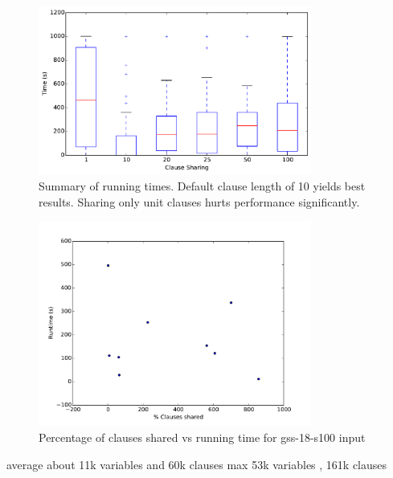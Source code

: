 \documentclass{article}
\begin{document}
\begin{figure}[h]
  \centering
    \includegraphics[width=0.8\textwidth]{../figs/boxplot_all.pdf}
  \caption{Summary of running times. Default clause length of 10 yields best results. Sharing only unit clauses hurts performance significantly.}
  \label{fig:boxplot-1}
\end{figure}



\begin{figure}[h]
  \centering
  \includegraphics[width=0.8\textwidth]{../figs/gss-18-s100.pdf}
  \caption{Percentage of clauses shared vs running time for gss-18-s100 input}
  \label{fig:gss}
\end{figure}

average about 11k variables and 60k clauses
max 53k variables , 161k clauses



\end{document}
